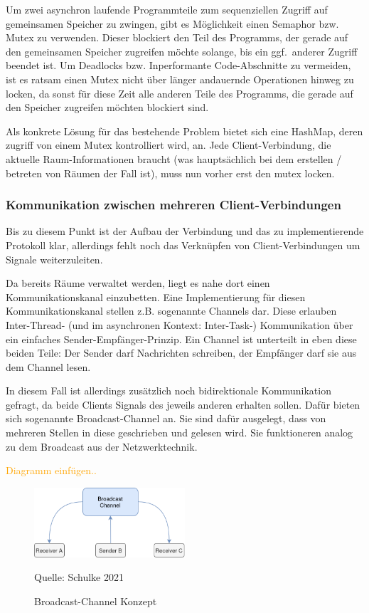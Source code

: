 \documentclass{article}
\newcommand{\figuresource}[1]{
	\begin{center}Quelle: #1\end{center}
}
\begin{document}
\begin{onecolumn}

Um zwei asynchron laufende Programmteile zum sequenziellen Zugriff auf
gemeinsamen Speicher zu zwingen, gibt es Möglichkeit einen Semaphor bzw. Mutex
zu verwenden. Dieser blockiert den Teil des Programms, der gerade auf den
gemeinsamen Speicher zugreifen möchte solange, bis ein ggf.\ anderer Zugriff
beendet ist. Um Deadlocks bzw. Inperformante Code-Abschnitte zu vermeiden, ist
es ratsam einen Mutex nicht über länger andauernde Operationen hinweg zu
locken, da sonst für diese Zeit alle anderen Teile des Programms, die gerade
auf den Speicher zugreifen möchten blockiert sind.

Als konkrete Lösung für das bestehende Problem bietet sich eine HashMap, deren
zugriff von einem Mutex kontrolliert wird, an. Jede Client-Verbindung, die
aktuelle Raum-Informationen braucht (was hauptsächlich bei dem erstellen /
betreten von Räumen der Fall ist), muss nun vorher erst den mutex locken. 

\subsubsection{Kommunikation zwischen mehreren Client-Verbindungen}

Bis zu diesem Punkt ist der Aufbau der Verbindung und das zu implementierende
Protokoll klar, allerdings fehlt noch das Verknüpfen von Client-Verbindungen um
Signale weiterzuleiten.

Da bereits Räume verwaltet werden, liegt es nahe dort einen Kommunikationskanal
einzubetten. Eine Implementierung für diesen Kommunikationskanal stellen z.B.
sogenannte Channels dar. Diese erlauben Inter-Thread- (und im asynchronen
Kontext: Inter-Task-) Kommunikation über ein einfaches
Sender-Empfänger-Prinzip. Ein Channel ist unterteilt in eben diese beiden
Teile: Der Sender darf Nachrichten schreiben, der Empfänger darf sie aus dem
Channel lesen.

In diesem Fall ist allerdings zusätzlich noch bidirektionale Kommunikation
gefragt, da beide Clients Signals des jeweils anderen erhalten sollen. Dafür
bieten sich sogenannte Broadcast-Channel an. Sie sind dafür ausgelegt, dass von
mehreren Stellen in diese geschrieben und gelesen wird. Sie funktioneren analog
zu dem Broadcast aus der Netzwerktechnik.

\textcolor{orange}{Diagramm einfügen..}

\begin{figure}[ht]
	\includegraphics[width=0.5\textwidth]{diagram-broadcast}
	\centering
	\caption{Broadcast-Channel Konzept}
	\figuresource{Schulke 2021}
\end{figure}


\end{onecolumn}
\end{document}
